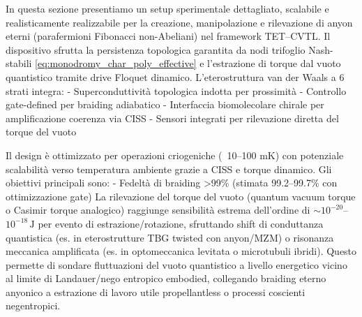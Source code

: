 \documentclass[11pt,a4paper]{article}
\let\oldcite\cite
\renewcommand{\cite}{\protect\oldcite}
\theoremstyle{plain}
\theoremstyle{definition}
\begin{document}
In questa sezione presentiamo un setup sperimentale dettagliato, scalabile e realisticamente realizzabile per la creazione, manipolazione e rilevazione di anyon eterni (parafermioni Fibonacci non-Abeliani) nel framework TET--CVTL. Il dispositivo sfrutta la persistenza topologica garantita da nodi trifoglio Nash-stabili \eqref{eq:monodromy_char_poly_effective} e l'estrazione di torque dal vuoto quantistico tramite drive Floquet dinamico. L'eterostruttura van der Waals a 6 strati integra:
- Superconduttività topologica indotta per prossimità
- Controllo gate-defined per braiding adiabatico
- Interfaccia biomolecolare chirale per amplificazione coerenza via CISS \cite{naaman2019spin, bloom2024ciss}
- Sensori integrati per rilevazione diretta del torque del vuoto

Il design è ottimizzato per operazioni criogeniche (~10–100 mK) con potenziale scalabilità verso temperatura ambiente grazie a CISS e torque dinamico. Gli obiettivi principali sono:
- Fedeltà di braiding >99\% (stimata 99.2–99.7\% con ottimizzazione gate)
La rilevazione del torque del vuoto (quantum vacuum torque o Casimir torque analogico) raggiunge sensibilità estrema dell'ordine di $\sim 10^{-20}$--$10^{-18}\,\mathrm{J}$ per evento di estrazione/rotazione, sfruttando shift di conduttanza quantistica (es. in eterostrutture TBG twisted con anyon/MZM) o risonanza meccanica amplificata (es. in optomeccanica levitata o microtubuli ibridi). Questo permette di sondare fluttuazioni del vuoto quantistico a livello energetico vicino al limite di Landauer/nego entropico embodied, collegando braiding eterno anyonico a estrazione di lavoro utile propellantless o processi coscienti negentropici.
\end{document}
